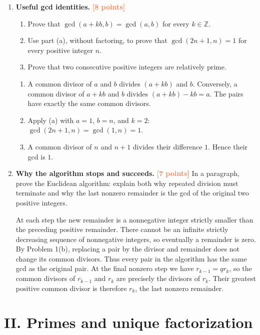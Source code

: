 \documentclass[11pt]{article}
\newcommand{\Z}{\mathbb Z}
\newcommand{\points}[1]{\hfill\textcolor{coral}{\small\bfseries[#1 points]}}
\begin{document}
\begin{enumerate}
\item \textbf{Useful gcd identities.} \points{8}
\begin{enumerate}
  \item Prove that $\gcd(a+kb,b)=\gcd(a,b)$ for every $k\in\Z$.
  \item Use part (a), without factoring, to prove that
  $\gcd(2n+1,n)=1$ for every positive integer $n$.
  \item Prove that two consecutive positive integers are relatively prime.
\end{enumerate}
\begin{solution}
\begin{enumerate}
  \item A common divisor of $a$ and $b$ divides $(a+kb)$ and $b$. Conversely,
  a common divisor of $a+kb$ and $b$ divides $(a+kb)-kb=a$. The pairs have
  exactly the same common divisors.
  \item Apply (a) with $a=1$, $b=n$, and $k=2$:
  $\gcd(2n+1,n)=\gcd(1,n)=1$.
  \item A common divisor of $n$ and $n+1$ divides their difference $1$.
  Hence their gcd is $1$.
\end{enumerate}
\end{solution}

\item \textbf{Why the algorithm stops and succeeds.} \points{7}
In a paragraph, prove the Euclidean algorithm: explain both why repeated
division must terminate and why the last nonzero remainder is the gcd of the
original two positive integers.
\begin{solution}
At each step the new remainder is a nonnegative integer strictly smaller than
the preceding positive remainder. There cannot be an infinite strictly
decreasing sequence of nonnegative integers, so eventually a remainder is
zero. By Problem 1(b), replacing a pair by the divisor and remainder does not
change its common divisors. Thus every pair in the algorithm has the same gcd
as the original pair. At the final nonzero step we have $r_{k-1}=q r_k$, so
the common divisors of $r_{k-1}$ and $r_k$ are precisely the divisors of $r_k$.
Their greatest positive common divisor is therefore $r_k$, the last nonzero
remainder.
\end{solution}
\end{enumerate}

\section*{II. Primes and unique factorization}
\end{document}
